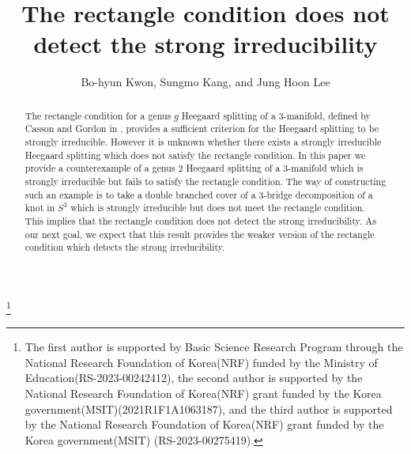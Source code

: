 \documentclass[12pt]{amsart}
\begin{document}
\title[The rectangle condition does not detect the strong irreducibility]{The rectangle condition does not detect the strong irreducibility}
\author{Bo-hyun Kwon, Sungmo Kang, and Jung Hoon Lee}

\address{Department of Mathematical Sciences, UNIST, 50 UNIST-gil, Ulsan 44919, Republic of Korea}
\address{Department of Mathematics Education, Chonnam National University, 77 Yongbong-ro, Buk-gu, Gwangju 61186, Republic of Korea}
\address{Department of Mathematics and Institute of Pure and Applied Mathematics, Jeonbuk National University, 567 Baekje-daero, Deokjin-gu, Jeonju, Jeonbuk, 54896, Republic of Korea}

\thanks{The first author is supported by Basic Science Research Program through the National Research Foundation of Korea(NRF) funded by the Ministry of Education(RS-2023-00242412), the second author is supported by the National Research Foundation of Korea(NRF) grant
funded by the Korea government(MSIT)(2021R1F1A1063187), and the third author is supported by the National Research Foundation of Korea(NRF) grant funded by the Korea government(MSIT) (RS-2023-00275419).}





\maketitle

\begin{abstract}
The rectangle condition for a genus $g$ Heegaard splitting of a 3-manifold, defined by Casson and Gordon in \cite{CG}, provides a sufficient criterion for the Heegaard splitting to be strongly irreducible. However it is unknown whether there exists a strongly irreducible Heegaard splitting which does not satisfy the rectangle condition. In this paper we provide a counterexample of a genus 2 Heegaard splitting of a 3-manifold which is strongly irreducible but fails to satisfy the rectangle condition. The way of constructing such an example is to take a double branched cover of a 3-bridge decomposition of a knot in $S^3$ which is strongly irreducible but does not meet the rectangle condition. This implies that the rectangle condition does not detect the strong irreducibility. As our next goal, we expect that this result provides the weaker version of the rectangle condition which detects the strong irreducibility.
\end{abstract}
\end{document}
